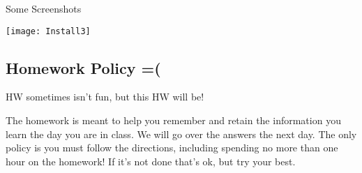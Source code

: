 \begin{frame}{Some Screenshots}
\begin{center}
\texttt{[image: Install3]}
\end{center}
\end{frame}



\subsection{Homework Policy =(}
\begin{frame}{HW sometimes isn't fun, but this HW will be!}
\begin{center}
The homework is meant to help you remember and retain the information you learn the day you are in class. We will go over the answers the next day. The only policy is you must follow the directions, including spending no more than one hour on the homework! If it's not done that's ok, but try your best.
\end{center}

\end{frame}